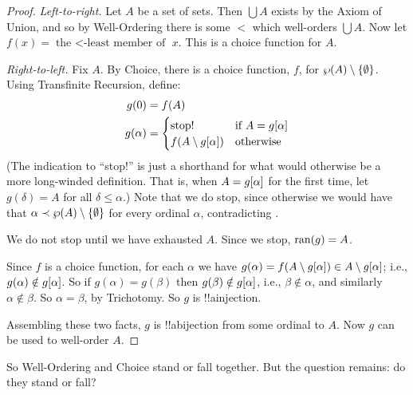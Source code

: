 \documentclass[../../../include/open-logic-section]{subfiles}
\begin{document}
\begin{proof}
\emph{Left-to-right.} Let $A$ be a set of sets. Then $\bigcup A$
exists by the Axiom of Union, and so by Well-Ordering there is some
$<$ which well-orders $\bigcup A$. Now let $f(x) = \text{the $<$-least
member of }x$. This is a choice function for $A$.

\emph{Right-to-left.} Fix $A$. By Choice, there is a choice function,
$f$,  for $\wp(A) \setminus \{\emptyset\}$. Using Transfinite
Recursion, define:
\begin{align*}
	g(0) &= f(A)\\
	g(\alpha) &= 
		\begin{cases}
			\text{stop!{}} &\text{if }A = \funimage{g}{\alpha}\\
			f(A \setminus \funimage{g}{\alpha}) & \text{otherwise}\\	
		\end{cases}
\end{align*}
(The indication to ``stop!'' is just a shorthand for what would
otherwise be a more long-winded definition. That is, when $A =
g[\alpha]$ for the first time, let $g(\delta) = A$ for all
$\delta \leq \alpha$.) Note that we do stop, since otherwise we would
have that $\alpha \prec \wp(A) \setminus \{\emptyset\}$ for
every ordinal $\alpha$, contradicting . 

We do not stop  until we have exhausted $A$. Since we stop, $\mathrm{ran}(g) =
A$. 

Since $f$ is a choice function, for each $\alpha$ we have $g(\alpha) =
f(A \setminus g[\alpha]) \in A \setminus
g[\alpha]$; i.e., $g(\alpha) \notin g[\alpha]$.
So if $g(\alpha) = g(\beta)$ then $g(\beta) \notin
g[\alpha]$, i.e., $\beta \notin \alpha$, and similarly
$\alpha \notin \beta$. So $\alpha = \beta$, by Trichotomy. So $g$ is
!!a{injection}.

Assembling these two facts, $g$ is !!a{bijection} from some ordinal to $A$. Now $g$ can be used to well-order $A$.
\end{proof}

So Well-Ordering and Choice stand or fall together. But the question
remains: do they stand or fall?
\end{document}

